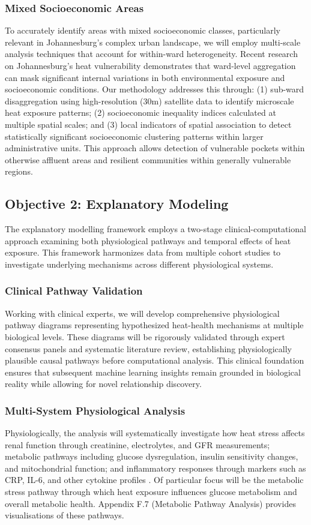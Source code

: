 \subsubsection{Mixed Socioeconomic Areas}
To accurately identify areas with mixed socioeconomic classes, particularly relevant in Johannesburg's complex urban landscape, we will employ multi-scale analysis techniques that account for within-ward heterogeneity. Recent research on Johannesburg's heat vulnerability \citep{Parker2023} demonstrates that ward-level aggregation can mask significant internal variations in both environmental exposure and socioeconomic conditions. Our methodology addresses this through: (1) sub-ward disaggregation using high-resolution (30m) satellite data to identify microscale heat exposure patterns; (2) socioeconomic inequality indices calculated at multiple spatial scales; and (3) local indicators of spatial association to detect statistically significant socioeconomic clustering patterns within larger administrative units. This approach allows detection of vulnerable pockets within otherwise affluent areas and resilient communities within generally vulnerable regions.

\subsection{Objective 2: Explanatory Modeling}
The explanatory modelling framework employs a two-stage clinical-computational approach examining both physiological pathways and temporal effects of heat exposure. This framework harmonizes data from multiple cohort studies to investigate underlying mechanisms across different physiological systems.

\subsubsection{Clinical Pathway Validation}
Working with clinical experts, we will develop comprehensive physiological pathway diagrams representing hypothesized heat-health mechanisms at multiple biological levels. These diagrams will be rigorously validated through expert consensus panels and systematic literature review, establishing physiologically plausible causal pathways before computational analysis. This clinical foundation ensures that subsequent machine learning insights remain grounded in biological reality while allowing for novel relationship discovery.

\subsubsection{Multi-System Physiological Analysis}
Physiologically, the analysis will systematically investigate how heat stress affects renal function through creatinine, electrolytes, and GFR measurements; metabolic pathways including glucose dysregulation, insulin sensitivity changes, and mitochondrial function; and inflammatory responses through markers such as CRP, IL-6, and other cytokine profiles \citep{Desai2023}. Of particular focus will be the metabolic stress pathway through which heat exposure influences glucose metabolism and overall metabolic health. Appendix F.7 (Metabolic Pathway Analysis) provides visualisations of these pathways.

